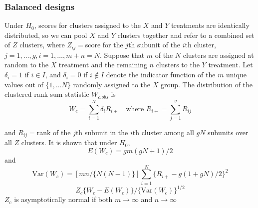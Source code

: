 \documentclass[article]{jss}
\begin{document}
\subsubsection{Balanced designs}\label{bal}
Under $H_0$, scores for clusters assigned to the $X$ and $Y$ treatments are identically distributed, so we can pool $X$ and $Y$ clusters together and refer to a combined set of $Z$ clusters, where $Z_{ij} = $score for the $j$th subunit of the $i$th cluster, $j = 1,\ldots,g,i=1,\ldots,m+n = N$. Suppose that $m$ of the $N$ clusters are assigned at random to the $X$ treatment and the remaining $n$ clusters to the $Y$ treatment. Let $\delta_i = 1$ if $i\in I$, and $\delta_i = 0$ if $i \not \in I$ denote the indicator function of the $m$ unique values out of $\{1, \ldots N\}$ randomly assigned to the $X$ group.  The distribution of the clustered rank sum statistic $W_{c.obs}$ is
\begin{equation}\label{eq:Wc}
W_c = \sum^N_{i=1}\delta_iR_{i+} \quad \text{where   }R_{i+} = \sum^g_{j=1}R_{ij}
\end{equation}

and $R_{ij}=$rank of the $j$th subunit in the $i$th cluster among all $gN$ subunits over all $Z$ clusters. It is shown that under $H_0$, 
\begin{equation}\label{eq:EWc}
E(W_c) = gm(gN + 1)/2
\end{equation}
and 
\begin{equation}\label{eq:VWc}
\text{Var}(W_c) = [mn/\{N(N-1)\}]\sum^N_{i=1}\{R_{i+} - g(1+gN)/2\}^2
\end{equation}
\begin{equation}
Z_c \{W_c - E(W_c)\}/\{\text{Var}(W_c)\}^{1/2}
\end{equation}
$Z_c$ is asymptotically normal if both $m \to \infty$ and $n \to \infty$
\end{document}
